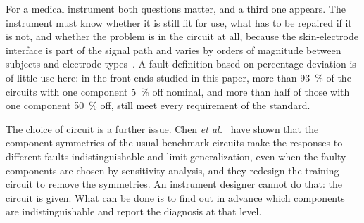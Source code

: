 For a medical instrument both questions matter, and a third one appears. The instrument must know
whether it is still fit for use, what has to be repaired if it is not, and whether the problem is
in the circuit at all, because the skin-electrode interface is part of the signal path and varies
by orders of magnitude between subjects and electrode types~\cite{joutsen2024}. A fault definition
based on percentage deviation is of little use here: in the front-ends studied in this paper, more
than \SI{93}{\percent} of the circuits with one component \SI{5}{\percent} off nominal, and more
than half of those with one component \SI{50}{\percent} off, still meet every requirement of the
standard.

The choice of circuit is a further issue. Chen \emph{et al.}~\cite{chen2025} have shown that the
component symmetries of the usual benchmark circuits make the responses to different faults
indistinguishable and limit generalization, even when the faulty components are chosen by
sensitivity analysis, and they redesign the training circuit to remove the symmetries. An
instrument designer cannot do that: the circuit is given. What can be done is to find out in
advance which components are indistinguishable and report the diagnosis at that level.

